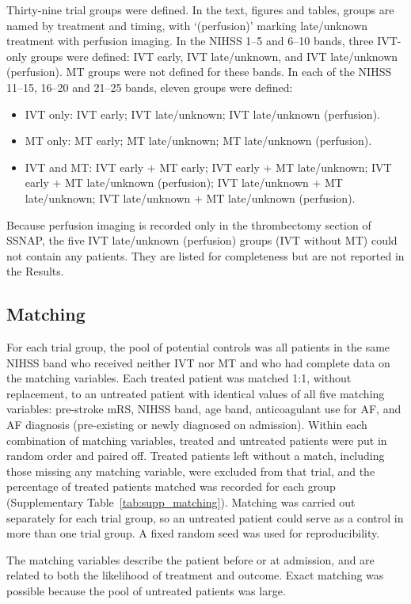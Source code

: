 Thirty-nine trial groups were defined. In the text, figures and tables, groups are named by treatment and timing, with `(perfusion)' marking late/unknown treatment with perfusion imaging. In the NIHSS 1--5 and 6--10 bands, three IVT-only groups were defined: IVT early, IVT late/unknown, and IVT late/unknown (perfusion). MT groups were not defined for these bands. In each of the NIHSS 11--15, 16--20 and 21--25 bands, eleven groups were defined:
\begin{itemize}
    \item IVT only: IVT early; IVT late/unknown; IVT late/unknown (perfusion).
    \item MT only: MT early; MT late/unknown; MT late/unknown (perfusion).
    \item IVT and MT: IVT early + MT early; IVT early + MT late/unknown; IVT early + MT late/unknown (perfusion); IVT late/unknown + MT late/unknown; IVT late/unknown + MT late/unknown (perfusion).
\end{itemize}
Because perfusion imaging is recorded only in the thrombectomy section of SSNAP, the five IVT late/unknown (perfusion) groups (IVT without MT) could not contain any patients. They are listed for completeness but are not reported in the Results.

\subsection*{Matching}

For each trial group, the pool of potential controls was all patients in the same NIHSS band who received neither IVT nor MT and who had complete data on the matching variables. Each treated patient was matched 1:1, without replacement, to an untreated patient with identical values of all five matching variables: pre-stroke mRS, NIHSS band, age band, anticoagulant use for AF, and AF diagnosis (pre-existing or newly diagnosed on admission)\cite{stuart_matching_2010}. Within each combination of matching variables, treated and untreated patients were put in random order and paired off. Treated patients left without a match, including those missing any matching variable, were excluded from that trial, and the percentage of treated patients matched was recorded for each group (Supplementary Table~\ref{tab:supp_matching}). Matching was carried out separately for each trial group, so an untreated patient could serve as a control in more than one trial group. A fixed random seed was used for reproducibility.

The matching variables describe the patient before or at admission, and are related to both the likelihood of treatment and outcome. Exact matching was possible because the pool of untreated patients was large.

